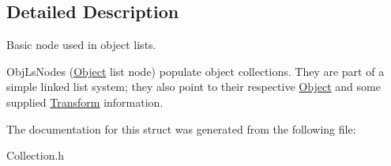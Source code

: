 \subsection{Detailed Description}
Basic node used in object lists. 

Obj\+Ls\+Nodes (\hyperlink{class_object}{Object} list node) populate object collections. They are part of a simple linked list system; they also point to their respective \hyperlink{class_object}{Object} and some supplied \hyperlink{class_transform}{Transform} information. 

The documentation for this struct was generated from the following file\+:\begin{DoxyCompactItemize}
\item 
Collection.\+h\end{DoxyCompactItemize}
